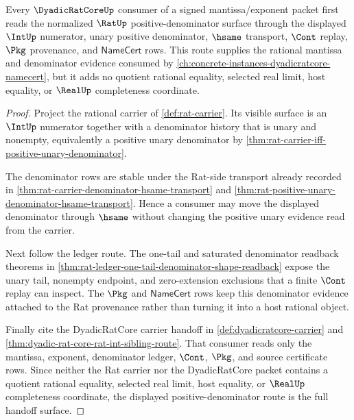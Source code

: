 \begin{theorem}
\label{thm:ratup-dyadicratcore-denominator-handoff}
Every $\DyadicRatCoreUp$ consumer of a signed mantissa/exponent packet first
reads the normalized $\RatUp$ positive-denominator surface through the
displayed $\IntUp$ numerator, unary positive denominator, $\hsame$ transport,
$\Cont$ replay, $\Pkg$ provenance, and $\mathsf{NameCert}$ rows. This route
supplies the rational mantissa and denominator evidence consumed by
\autoref{ch:concrete-instances-dyadicratcore-namecert}, but it adds no
quotient rational equality, selected real limit, host equality, or
$\RealUp$ completeness coordinate.
\end{theorem}
\begin{proof}
Project the rational carrier of \autoref{def:rat-carrier}. Its visible
surface is an $\IntUp$ numerator together with a denominator history that is
unary and nonempty, equivalently a positive unary denominator by
\autoref{thm:rat-carrier-iff-positive-unary-denominator}.

The denominator rows are stable under the Rat-side transport already recorded
in \autoref{thm:rat-carrier-denominator-hsame-transport} and
\autoref{thm:rat-positive-unary-denominator-hsame-transport}. Hence a
consumer may move the displayed denominator through $\hsame$ without changing
the positive unary evidence read from the carrier.

Next follow the ledger route. The one-tail and saturated denominator readback
theorems in \autoref{thm:rat-ledger-one-tail-denominator-shape-readback}
expose the unary tail, nonempty endpoint, and zero-extension exclusions that a
finite $\Cont$ replay can inspect. The $\Pkg$ and $\mathsf{NameCert}$ rows keep
this denominator evidence attached to the Rat provenance rather than turning
it into a host rational object.

Finally cite the DyadicRatCore carrier handoff in
\autoref{def:dyadicratcore-carrier} and
\autoref{thm:dyadic-rat-core-rat-int-sibling-route}. That consumer reads only
the mantissa, exponent, denominator ledger, $\Cont$, $\Pkg$, and source
certificate rows. Since neither the Rat carrier nor the DyadicRatCore packet
contains a quotient rational equality, selected real limit, host equality, or
$\RealUp$ completeness coordinate, the displayed positive-denominator route is
the full handoff surface.
\end{proof}


